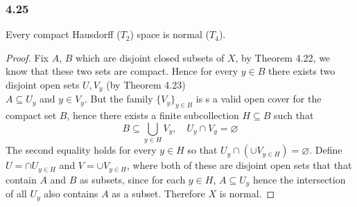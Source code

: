 \documentclass[../../main.tex]{subfiles}
\begin{document}
\subsubsection*{4.25}
\begin{wts}
Every compact Hausdorff ($T_2$) space is normal ($T_4$).
\end{wts}
\begin{proof}
Fix $A$, $B$ which are disjoint closed subsets of $X$, by Theorem 4.22, we know that these two sets are compact. Hence for every $y\in B$ there exists two disjoint open sets $U, V_y$ (by Theorem 4.23)\\

$A\subseteq U_y$ and $y\in V_y$. But the family $\{V_y\}_{y\in B}$ is s a valid open cover for the compact set $B$, hence there exists a finite subcollection $H\subseteq B$ such that 
\[
B\subseteq \bigcup_{y\in H}V_y,\quad U_y\cap V_y=\varnothing
\]
The second equality holds for every $y\in H$ so that $U_y\cap(\cup V_{y\in H})=\varnothing$. Define $U = \cap U_{y\in H}$ and $V = \cup V_{y\in H}$, where both of these are disjoint open sets that that contain $A$ and $B$ as subsets, since for each $y\in H$, $A\subseteq U_y$ hence the intersection of all $U_y$ also contains $A$ as a subset. Therefore $X$ is normal.
\end{proof}
\end{document}
